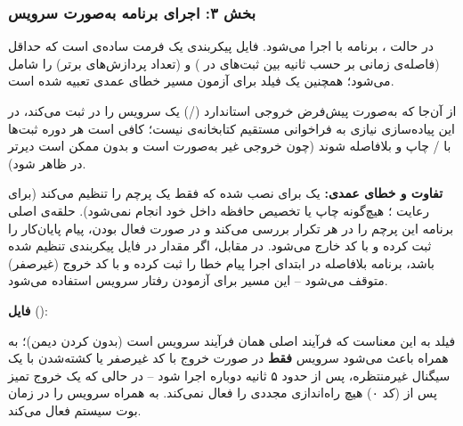 \subsubsection*{بخش ۳: اجرای برنامه به‌صورت سرویس }

در حالت ، برنامه با  اجرا می‌شود. فایل پیکربندی یک فرمت ساده‌ی  است که حداقل  (فاصله‌ی زمانی بر حسب ثانیه بین ثبت‌های  در ) و  (تعداد پردازش‌های برتر) را شامل می‌شود؛ همچنین یک فیلد  برای آزمون مسیر خطای عمدی تعبیه شده است.

از آن‌جا که  به‌صورت پیش‌فرض خروجی استاندارد (/) یک سرویس را در  ثبت می‌کند، در این پیاده‌سازی نیازی به فراخوانی مستقیم  کتابخانه‌ی  نیست؛ کافی است هر دوره ثبت‌ها با / چاپ و بلافاصله  شوند (چون خروجی غیر به‌صورت  است و بدون  ممکن است دیرتر در  ظاهر شود).

\textbf{تفاوت  و خطای عمدی:} یک  برای  نصب شده که فقط یک پرچم  را تنظیم می‌کند (برای رعایت ؛ هیچ‌گونه چاپ یا تخصیص حافظه داخل خود  انجام نمی‌شود). حلقه‌ی اصلی برنامه این پرچم را در هر تکرار بررسی می‌کند و در صورت فعال بودن، پیام پایان‌کار را ثبت کرده و با کد  خارج می‌شود. در مقابل، اگر مقدار  در فایل پیکربندی تنظیم شده باشد، برنامه بلافاصله در ابتدای اجرا پیام خطا را ثبت کرده و با کد خروج  (غیرصفر) متوقف می‌شود -- این مسیر برای آزمودن رفتار  سرویس  استفاده می‌شود.

\begin{latin}

\end{latin}

\textbf{فایل } ():

\begin{latin}

\end{latin}

فیلد  به این معناست که فرآیند اصلی  همان فرآیند سرویس است (بدون  کردن دیمن)؛  به همراه  باعث می‌شود سرویس \textbf{فقط} در صورت خروج با کد غیرصفر یا کشته‌شدن با یک سیگنال غیرمنتظره، پس از حدود ۵ ثانیه دوباره اجرا شود -- در حالی که یک خروج تمیز پس از  (کد ۰) هیچ راه‌اندازی مجددی را فعال نمی‌کند.  به همراه  سرویس را در زمان بوت سیستم فعال می‌کند.

